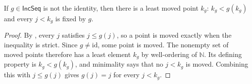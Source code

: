 \begin{lemma}
If $g\in\mathsf{IncSeq}$ is not the identity, then there is a least moved
point $k_g$: $k_g<g(k_g)$ and every $j<k_g$ is fixed by $g$.
\end{lemma}
\begin{proof}
By , every $j$ satisfies $j\leq g(j)$, so a point
is moved exactly when the inequality is strict.  Since $g\neq\mathrm{id}$,
some point is moved.  The nonempty set of moved points therefore has a least
element $k_g$ by well-ordering of $\mathbb N$.  Its defining property is
$k_g<g(k_g)$, and minimality says that no $j<k_g$ is moved.  Combining this
with $j\leq g(j)$ gives $g(j)=j$ for every $j<k_g$.
\end{proof}
